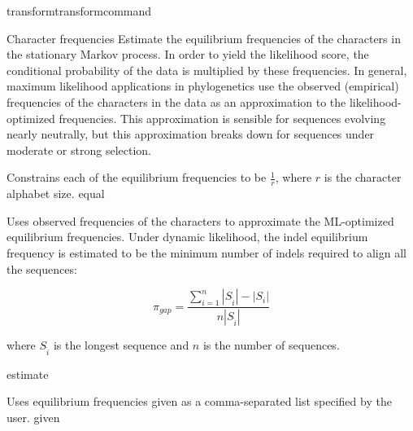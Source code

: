 \begin{command}{transform}{transformcommand}
\begin{arguments}
	\begin{argumentgroup} {Character frequencies} %
		Estimate the equilibrium frequencies of the characters in the stationary
                    Markov process. In order to yield the likelihood score, the 
                    conditional probability of the data is multiplied by these frequencies. 
                    In general, maximum likelihood applications in phylogenetics use  the observed (empirical)
                    frequencies of the characters in the data  as an
                    approximation to the likelihood-optimized frequencies. This
                    approximation is sensible for sequences evolving nearly
                    neutrally, but this approximation breaks down for sequences
                    under moderate or strong selection.

                            {Constrains each of the equilibrium frequencies to be
                            $\frac{1}{r}$, where $r$ is the character alphabet size.}
                            {equal}

                            {Uses observed frequencies of the characters to
                            approximate the ML-optimized equilibrium
                            frequencies.  Under dynamic likelihood, the indel
                            equilibrium frequency is estimated to be the minimum
                            number of indels required to align all the
                            sequences: 
                            
                         \begin{equation*}
                            \pi_{gap} = \frac{\sum_{i=1}^n
                            |S_{\hat{i}}| - |S_i|}{n |S_{\hat{i}}|}
                            \end{equation*}
                            
                             where
                            $S_{\hat{i}}$ is the longest sequence and $n$ is the number of sequences.}
                            {estimate}

                            {Uses equilibrium frequencies given as a
                            comma-separated list specified by the user.} 
                            {given}


\end{argumentgroup}
\end{arguments}
\end{command}
